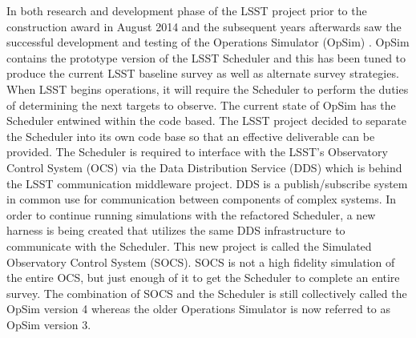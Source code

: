 \documentclass[]{spie}  %
\begin{document}
In both research and development phase of the LSST project prior to the construction award in August 2014 and the subsequent years afterwards saw the successful development and testing of the Operations Simulator (OpSim) \cite{2014SPIE.9149E..0GD}\cite{2014SPIE.9150E..15D}\cite{2013AAS...22124703S}\cite{2010SPIE.7737E..0ZR}\cite{2010AAS...21540105K}\cite{2009AAS...21346004C}\cite{2007AAS...21113703P}\cite{2006SPIE.6270E..1DD}\cite{2006AAS...209.8604P}\cite{2005AAS...207.2626C}\cite{2004AAS...20510809C} . OpSim contains the prototype version of the LSST Scheduler and this has been tuned to produce the current LSST baseline survey as well as alternate survey strategies\cite{Cook_SPIE2016}. When LSST begins operations, it will require the Scheduler to perform the duties of determining the next targets to observe. The current state of OpSim has the Scheduler entwined within the code based. The LSST project decided to separate the Scheduler\cite{Delgado_SPIE2016} into its own code base so that an effective deliverable can be provided. The Scheduler is required to interface with the LSST's Observatory Control System (OCS)\cite{Daly_SPIE2016} via the Data Distribution Service (DDS) which is behind the LSST communication middleware\cite{Mills_SPIE2016} project. DDS is a publish/subscribe system in common use for communication between
components of complex systems. In order to continue running simulations with the refactored Scheduler, a new harness is being created that utilizes the same DDS infrastructure to communicate with the Scheduler. This new project is called the Simulated Observatory Control System (SOCS). SOCS is not a high fidelity simulation of the entire OCS, but just enough of it to get the Scheduler to complete an entire survey. The combination of SOCS and the Scheduler is still collectively called the OpSim version 4 whereas the older Operations Simulator is now referred to as OpSim version 3.
\end{document}
